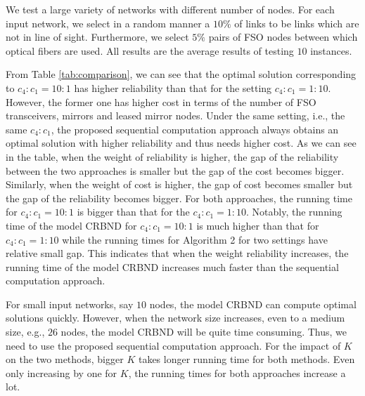\documentclass[onecolumn,11pt,draftclsnofoot]{IEEEtran}
\begin{document}
We test a large variety of networks with different number of nodes. For each input network, we select in a random manner a $10\%$ of links to be links which are not in line of sight. Furthermore, we select $5\%$ pairs of FSO nodes between which optical fibers are used. All results are the average results of testing $10$ instances.

From Table \ref{tab:comparison}, we can see that the optimal solution corresponding to $c_4:c_1=10:1$ has higher reliability than that for the setting $c_4:c_1=1:10$.  However, the former one has higher cost in terms of the number of FSO transceivers, mirrors and leased mirror nodes. Under the same setting, i.e., the same $c_4:c_1$, the proposed sequential computation approach always obtains an optimal solution with higher reliability and thus needs higher cost. As we can see in the table, when the weight of reliability is higher, the gap of the reliability between the two approaches is smaller but the gap of the cost becomes bigger. Similarly, when the weight of cost is higher, the gap of cost becomes smaller but the gap of the reliability becomes bigger. For both approaches, the running time for $c_4:c_1=10:1$ is bigger than that for the $c_4:c_1=1:10$. Notably, the running time of the model CRBND for $c_4:c_1=10:1$ is much higher than that for $c_4:c_1=1:10$ while the running times for Algorithm 2 for two settings have relative small gap. This indicates that when the weight reliability increases, the running time of the model CRBND increases much faster than the sequential computation approach.

For small input networks, say $10$ nodes, the model CRBND can compute optimal solutions quickly. However, when the network size increases, even to a medium size, e.g., $26$ nodes, the model CRBND will be quite time consuming. Thus, we need to use the proposed sequential computation approach. For the impact of $K$ on the two methods, bigger $K$ takes longer running time for both methods. Even only increasing by one for $K$, the running times for both approaches increase a lot.
\end{document}
